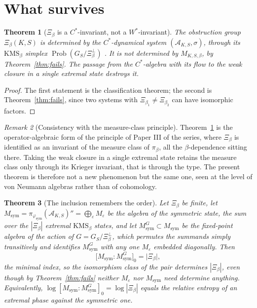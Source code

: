 \documentclass[11pt]{amsart}
\numberwithin{equation}{section}
\newtheorem{theorem}{Theorem}[section]
\theoremstyle{definition}
\theoremstyle{remark}
\newtheorem{remark}[theorem]{Remark}
\newcommand{\cA}{\mathcal{A}}
\newcommand{\Prob}{\operatorname{Prob}}
\newcommand{\Msym}{M_{\mathrm{sym}}}
\newcommand{\phisym}{\varphi_{\mathrm{sym}}}
\begin{document}
\section{What survives}

\begin{theorem}[$\Xi_\beta$ is a $C^*$-invariant, not a $W^*$-invariant]\label{thm:Cstar}
The obstruction group $\Xi_\beta(K,S)$ is determined by the $C^*$-dynamical system
$(\cA_{K,S},\sigma)$, through its $\mathrm{KMS}_\beta$ simplex
$\Prob(G_S/\Xi_\beta^\perp)$ \cite[Thm.~3.6]{Main}. It is \emph{not} determined by
$M_{K,S,\beta}$, by Theorem~\ref{thm:fails}. The passage from the $C^*$-algebra with its
flow to the weak closure in a single extremal state destroys it.
\end{theorem}

\begin{proof}
The first statement is the classification theorem; the second is Theorem~\ref{thm:fails},
since two systems with $\Xi_{\beta_1}\ne\Xi_{\beta_2}$ can have isomorphic factors.
\end{proof}

\begin{remark}[Consistency with the measure-class principle]\label{rem:measureclass}
Theorem~\ref{thm:Cstar} is the operator-algebraic form of the principle of Paper III of the
series, where $\Xi_\beta$ is identified as an invariant of the measure class of $\pi_\beta$,
all the $\beta$-dependence sitting there. Taking the weak closure in a single extremal state retains
the measure class only through its Krieger invariant, that is through the type. The present
theorem is therefore not a new phenomenon but the same one, seen at the level of von Neumann
algebras rather than of cohomology.
\end{remark}

\begin{theorem}[The inclusion remembers the order]\label{thm:inclusion}
Let $\Xi_\beta$ be finite, let $\Msym=\pi_{\phisym}(\cA_{K,S})''=\bigoplus_{\varepsilon}M_\varepsilon$
be the algebra of the symmetric state, the sum over the $|\Xi_\beta|$ extremal
$\mathrm{KMS}_\beta$ states, and let $\Msym^{G}\subset\Msym$ be the fixed-point algebra of the
action of $G=G_S/\Xi_\beta^\perp$, which permutes the summands simply transitively and
identifies $\Msym^G$ with any one $M_\varepsilon$ embedded diagonally. Then
\[
\bigl[\Msym:\Msym^{G}\bigr]_0=\bigl|\Xi_\beta\bigr| ,
\]
the minimal index, so the isomorphism class of the \emph{pair} determines $|\Xi_\beta|$,
even though by Theorem~\ref{thm:fails} neither $M_\varepsilon$ nor $\Msym$ need determine
anything. Equivalently, $\log[\Msym:\Msym^G]_0=\log|\Xi_\beta|$ equals the relative entropy
of an extremal phase against the symmetric one.
\end{theorem}
\end{document}
